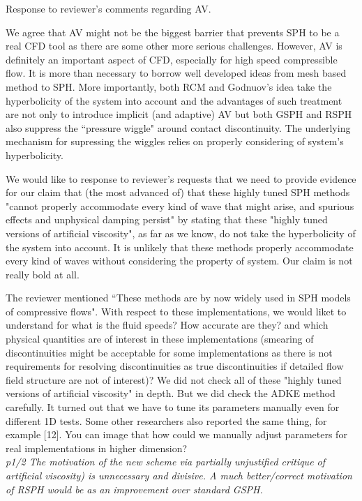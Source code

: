 \documentclass[10pt,a4paper]{article}
\begin{document}
Response to reviewer's comments regarding AV.

We agree that AV might not be the biggest barrier that prevents SPH to be a real CFD tool as there are some other more serious challenges. However, AV is definitely an important aspect of CFD, especially for high speed compressible flow. It is more than necessary to borrow well developed ideas from mesh based method to SPH.
More importantly, both RCM and Godnuov's idea take the hyperbolicity of the system into account and the advantages of such treatment are not only to introduce implicit (and adaptive) AV but both GSPH and RSPH also suppress the ``pressure wiggle" around contact discontinuity. The underlying mechanism for supressing the wiggles relies on properly considering of system's hyperbolicity.

We would like to response to reviewer's requests that we need to provide evidence for our claim that (the most advanced of) that these highly tuned SPH methods "cannot properly accommodate every kind of wave that might arise, and spurious effects and unphysical damping persist" by stating that these "highly tuned versions of artificial viscosity", as far as we know, do not take the hyperbolicity of the system into account. It is unlikely that these methods properly accommodate every kind of waves without considering the property of system. Our claim is not really bold at all.

The reviewer mentioned ``These methods are by now widely used in SPH models of compressive flows". With respect to these implementations, we would liket to understand for what is the fluid speeds? How accurate are they? and which physical quantities are of interest in these implementations (smearing of discontinuities might be acceptable for some implementations as there is not requirements for resolving discontinuities as true discontinuities if detailed flow field structure are not of interest)?
We did not check all of these "highly tuned versions of artificial viscosity" in depth. But we did check the ADKE method carefully. It turned out that we have to tune its parameters manually even for different 1D tests. Some other researchers also reported the same thing, for example [12]. You can image that how could we manually adjust parameters for real implementations in higher dimension?
\\[3pt]
 
\textit{p1/2 The motivation of the new scheme via partially unjustified critique of artificial viscosity) is unnecessary and divisive. A much
better/correct motivation of RSPH would be as an improvement over standard GSPH.}
\end{document}
